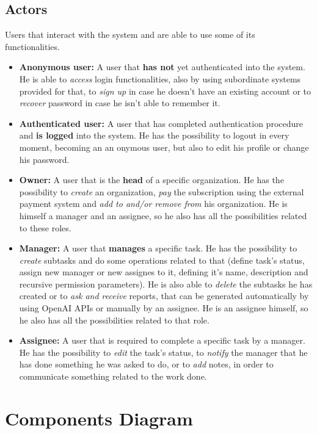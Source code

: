 \documentclass{article}
\begin{document}
\subsection{Actors}
Users that interact with the system and are able to use some of its functionalities.
\begin{itemize}
    \item \textbf{Anonymous user:} A user that \textbf{has not} yet authenticated into the system. He is able to \textit{access} login functionalities, also by using subordinate systems provided for that, to \textit{sign up} in case he doesn't have an existing account or to \textit{recover} password in case he isn't able to remember it.
    \item \textbf{Authenticated user:} A user that has completed authentication procedure and \textbf{is logged} into the system. He has the possibility to logout in every moment, becoming an an onymous user, but also to edit his profile or change his password.
    \item \textbf{Owner:} A user that is the \textbf{head} of a specific organization. He has the possibility to \textit{create} an organization, \textit{pay} the subscription using the external payment system and \textit{add to and/or remove from} his organization. He is himself a manager and an assignee, so he also has all the possibilities related to these roles.
    \item \textbf{Manager:} A user that \textbf{manages} a specific task. He has the possibility to \textit{create} subtasks and do some operations related to that (define task's status, assign new manager or new assignes to it, defining it's name, description and recursive permission parameters). He is also able to \textit{delete} the subtasks he has created or to \textit{ask and receive} reports, that can be generated automatically by using OpenAI APIs or manually by an assignee. He is an assignee himself, so he also has all the possibilities related to that role.
    \item \textbf{Assignee:} A user that is required to complete a specific task by a manager. He has the possibility to \textit{edit} the task's status, to \textit{notify} the manager that he has done something he was asked to do, or to \textit{add} notes, in order to communicate something related to the work done.
\end{itemize}

\section{Components Diagram}
\end{document}
